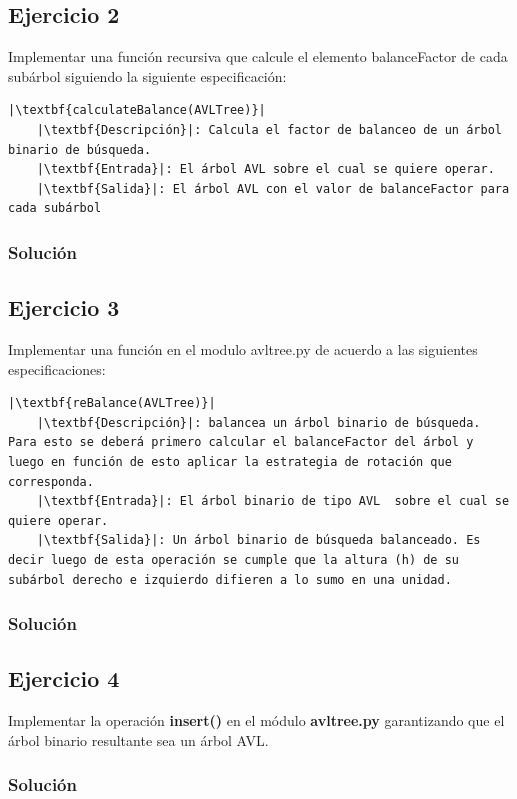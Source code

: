 \documentclass{article}
\begin{document}
\pagebreak
\subsection*{Ejercicio 2}
Implementar una función recursiva que calcule el elemento balanceFactor de cada subárbol siguiendo la siguiente especificación:
\begin{lstlisting}
|\textbf{calculateBalance(AVLTree)}|
    |\textbf{Descripción}|: Calcula el factor de balanceo de un árbol binario de búsqueda.
    |\textbf{Entrada}|: El árbol AVL sobre el cual se quiere operar.
    |\textbf{Salida}|: El árbol AVL con el valor de balanceFactor para cada subárbol
\end{lstlisting}
\subsubsection*{Solución}


\pagebreak
\subsection*{Ejercicio 3}
Implementar una función en el modulo avltree.py de acuerdo a  las siguientes especificaciones:
\begin{lstlisting}
|\textbf{reBalance(AVLTree)}|
    |\textbf{Descripción}|: balancea un árbol binario de búsqueda. Para esto se deberá primero calcular el balanceFactor del árbol y luego en función de esto aplicar la estrategia de rotación que corresponda.
    |\textbf{Entrada}|: El árbol binario de tipo AVL  sobre el cual se quiere operar.
    |\textbf{Salida}|: Un árbol binario de búsqueda balanceado. Es decir luego de esta operación se cumple que la altura (h) de su subárbol derecho e izquierdo difieren a lo sumo en una unidad.
\end{lstlisting}
\subsubsection*{Solución}
\setlength{\fboxsep}{0pt}


\pagebreak
\subsection*{Ejercicio 4}
Implementar la operación \textbf{insert()} en  el módulo \textbf{avltree.py} garantizando que el árbol  binario resultante sea un árbol AVL.
\subsubsection*{Solución}
\end{document}
